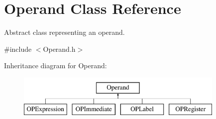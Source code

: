 \hypertarget{class_operand}{}\section{Operand Class Reference}
\label{class_operand}


Abstract class representing an operand.  




{\ttfamily \#include $<$Operand.\+h$>$}

Inheritance diagram for Operand\+:\begin{figure}[H]
\begin{center}
\leavevmode
\includegraphics[height=2.000000cm]{class_operand}
\end{center}
\end{figure}
